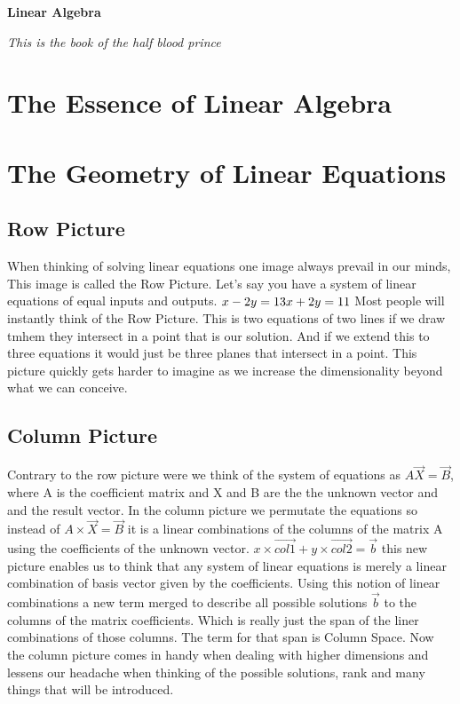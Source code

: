 \documentclass{book}
\begin{document}
	\begin{titlepage}
		\centering
		{\huge\bfseries Linear Algebra \par}
		\vspace{1cm}
		{\Large\itshape This is the book of the half blood prince\par}	
	\end{titlepage}
	
	\chapter{The Essence of Linear Algebra}
	
	\chapter{The Geometry of Linear Equations}
	\section*{Row Picture}
	When thinking of solving linear equations one image always prevail in our minds, This image is called the Row Picture.
	\newline Let's say you have a system of linear equations of equal inputs and outputs.
	\newline$x - 2y = 1 \newline 3x + 2y = 11$ 
	\newline Most people will instantly think of the Row Picture. This is two equations of two lines if we draw tmhem 
	they intersect in a point that is our solution.
	And if we extend this to three equations it would just be three planes that intersect in a point. 
	\newline This picture quickly gets harder to imagine as we increase the dimensionality beyond what we can conceive.
	
	\section*{Column Picture}
	 Contrary to the row picture were we think of the system of equations as $A\vec{X} = \vec{B}$, where A is the coefficient matrix and X and B are the the unknown vector and and the result vector.
	 In the column picture we permutate the equations so instead of  $A\times\vec{X} = \vec{B}$ it is a linear combinations of the columns of the matrix A using the coefficients of the unknown vector. $x\times\vec{col1} + y\times\vec{col2} = \vec{b}$ this new picture enables us to think that any system of linear equations is merely a linear combination of basis vector given by the coefficients.
	 \newline Using this notion of linear combinations a new term merged to describe all possible solutions $\vec{b}$ to the columns of the matrix coefficients. Which is really just the span of the liner combinations of those columns. The term for that span is Column Space.
	 \newline Now the column picture comes in handy when dealing with higher dimensions and lessens our headache when thinking of the possible solutions, rank and many things that will be introduced.
	 
\end{document}

